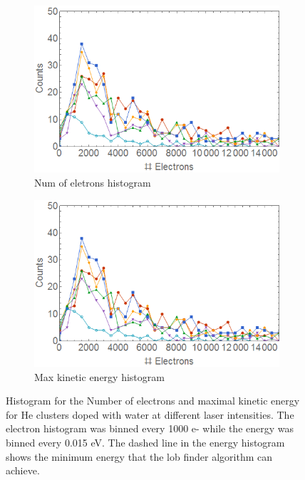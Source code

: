 \begin{figure}[h!]
\centering
\begin{subfigure}[l]{0.49\textwidth}\caption{Num of eletrons histogram}
\includegraphics[width=1\textwidth]{../Images/results/MIR_He_waterIntensityscan/Helect.png} 
\end{subfigure}
\begin{subfigure}[l]{0.49\textwidth}\caption{Max kinetic energy histogram}
\includegraphics[width=1\textwidth]{../Images/results/MIR_He_waterIntensityscan/Helect.png}   				\end{subfigure}
\caption[MIR He-intensity dependence. Histogram]{Histogram for the Number of electrons and maximal kinetic energy for He clusters doped with water at different laser intensities. The electron histogram was binned every 1000 e- while the energy was binned every 0.015 eV. The dashed line in the energy histogram shows the minimum energy that the lob finder algorithm can achieve.}
\label{fig:intehistowater}
\end{figure}
 

